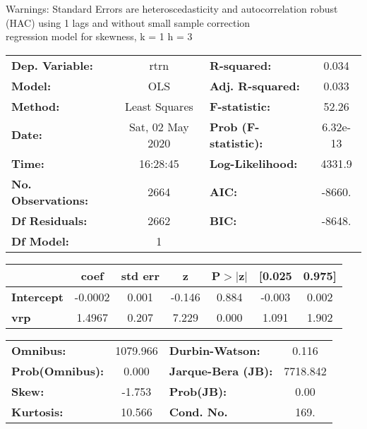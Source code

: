 Warnings: \newline
 [1] Standard Errors are heteroscedasticity and autocorrelation robust (HAC) using 1 lags and without small sample correction\\ 

regression model for skewness, k = 1 h = 3\begin{center}
\begin{tabular}{lclc}
\toprule
\textbf{Dep. Variable:}    &       rtrn       & \textbf{  R-squared:         } &     0.034   \\
\textbf{Model:}            &       OLS        & \textbf{  Adj. R-squared:    } &     0.033   \\
\textbf{Method:}           &  Least Squares   & \textbf{  F-statistic:       } &     52.26   \\
\textbf{Date:}             & Sat, 02 May 2020 & \textbf{  Prob (F-statistic):} &  6.32e-13   \\
\textbf{Time:}             &     16:28:45     & \textbf{  Log-Likelihood:    } &    4331.9   \\
\textbf{No. Observations:} &        2664      & \textbf{  AIC:               } &    -8660.   \\
\textbf{Df Residuals:}     &        2662      & \textbf{  BIC:               } &    -8648.   \\
\textbf{Df Model:}         &           1      & \textbf{                     } &             \\
\bottomrule
\end{tabular}
\begin{tabular}{lcccccc}
                   & \textbf{coef} & \textbf{std err} & \textbf{z} & \textbf{P$> |$z$|$} & \textbf{[0.025} & \textbf{0.975]}  \\
\midrule
\textbf{Intercept} &      -0.0002  &        0.001     &    -0.146  &         0.884        &       -0.003    &        0.002     \\
\textbf{vrp}       &       1.4967  &        0.207     &     7.229  &         0.000        &        1.091    &        1.902     \\
\bottomrule
\end{tabular}
\begin{tabular}{lclc}
\textbf{Omnibus:}       & 1079.966 & \textbf{  Durbin-Watson:     } &    0.116  \\
\textbf{Prob(Omnibus):} &   0.000  & \textbf{  Jarque-Bera (JB):  } & 7718.842  \\
\textbf{Skew:}          &  -1.753  & \textbf{  Prob(JB):          } &     0.00  \\
\textbf{Kurtosis:}      &  10.566  & \textbf{  Cond. No.          } &     169.  \\
\bottomrule
\end{tabular}
\end{center}

